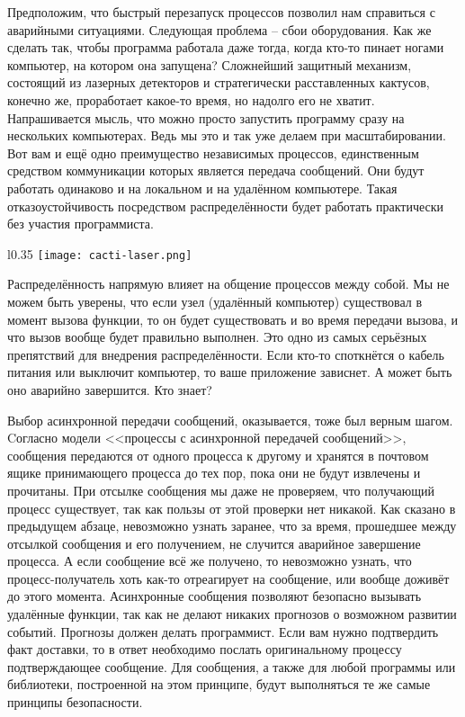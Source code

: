 Предположим, что быстрый перезапуск процессов позволил нам справиться с аварийными ситуациями.
Следующая проблема \--- сбои оборудования.
Как же сделать так, чтобы программа работала даже тогда, когда кто\--то пинает ногами компьютер, на котором она запущена?
Сложнейший защитный механизм, состоящий из лазерных детекторов и стратегически расставленных кактусов, конечно же, проработает какое\--то время, но надолго его не хватит.
Напрашивается мысль, что можно просто запустить программу сразу на нескольких компьютерах.
Ведь мы это и так уже делаем при масштабировании.
Вот вам и ещё одно преимущество независимых процессов, единственным средством коммуникации которых является передача сообщений.
Они будут работать одинаково и на локальном и на удалённом компьютере.
Такая отказоустойчивость посредством распределённости будет работать практически без участия программиста.
\begin{wrapfigure}{l}{0.35\linewidth}
    \texttt{[image: cacti-laser.png]}
\end{wrapfigure}

Распределённость напрямую влияет на общение процессов между собой.
Мы не можем быть уверены, что если узел (удалённый компьютер) существовал в момент вызова функции, то он будет существовать и во время передачи вызова, и что вызов вообще будет правильно выполнен.
Это одно из самых серьёзных препятствий для внедрения распределённости.
Если кто\--то споткнётся о кабель питания или выключит компьютер, то ваше приложение зависнет.
А может быть оно аварийно завершится.
Кто знает?

Выбор асинхронной передачи сообщений, оказывается, тоже был верным шагом.
Cогласно модели <<процессы с асинхронной передачей сообщений>>, сообщения передаются от одного процесса к другому и хранятся в почтовом ящике принимающего процесса до тех пор, пока они не будут извлечены и прочитаны.
При отсылке сообщения мы даже не проверяем, что получающий процесс существует, так как пользы от этой проверки нет никакой.
Как сказано в предыдущем абзаце, невозможно узнать заранее, что за время, прошедшее между отсылкой сообщения и его получением, не случится аварийное завершение процесса.
А если сообщение всё же получено, то невозможно узнать, что процесс\--получатель хоть как\--то отреагирует на сообщение, или вообще доживёт до этого момента.
Асинхронные сообщения позволяют безопасно вызывать удалённые функции, так как не делают никаких прогнозов о возможном развитии событий.
Прогнозы  должен делать программист.
Если вам нужно подтвердить факт доставки, то в ответ необходимо послать оригинальному процессу подтверждающее сообщение.
Для сообщения, а также для любой программы или библиотеки, построенной на этом принципе, будут выполняться те же самые принципы безопасности.
